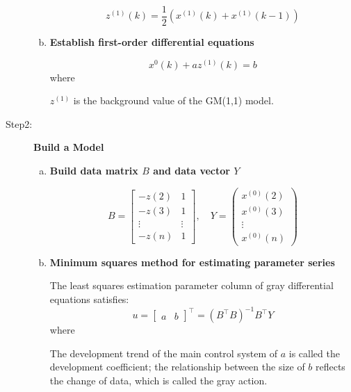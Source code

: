 \documentclass[12pt]{article}
\begin{document}
\begin{description}
\begin{enumerate}[a)]
			\begin{equation}\label{eq:adjacent2}
				z^{(1)}(k) = \frac{1}{2} (x^{(1)}(k) + x^{(1)}(k - 1))
			\end{equation}
			
			\item \textbf{Establish first-order differential equations}
			
			\begin{equation}\label{eq:diff_equation}
				x^{0}(k) + a z^{(1)}(k) = b
			\end{equation}
			where
			
			\qquad $z^{(1)}$ is the background value of the GM(1,1) model.
		\end{enumerate}
		
		\item[Step2:] \textbf{Build a Model}
		\begin{enumerate}[a)]
			\item \textbf{Build data matrix $B$ and data vector $Y$}
			
			\begin{equation}\label{mat:data1}
				B = 
				\begin{bmatrix}
					-z(2) & 1\\
					-z(3) & 1\\
					\vdots& \vdots\\
					-z(n) & 1
				\end{bmatrix}, \quad
				Y =
				\begin{pmatrix}
					x^{(0)}(2) \\
					x^{(0)}(3) \\
					\vdots  \\
					x^{(0)}(n)
				\end{pmatrix}
			\end{equation}
			
			\newpage
			
			\item \textbf{Minimum squares method for estimating parameter series}
			
			The least squares estimation parameter column of gray differential equations satisfies:
			\begin{equation}\label{eq:data2}
				u =
				\begin{bmatrix}
					a & b
				\end{bmatrix}^{\top}
				=
				\left ( B^{\top}B  \right )^{-1}B^{\top}Y 
			\end{equation}
			where
			
			\qquad The development trend of the main control system of $a$ is called the development coefficient; the relationship between the size of $b$ reflects the change of data, which is called the gray action.
			

\end{enumerate}
\end{description}
\end{document}
